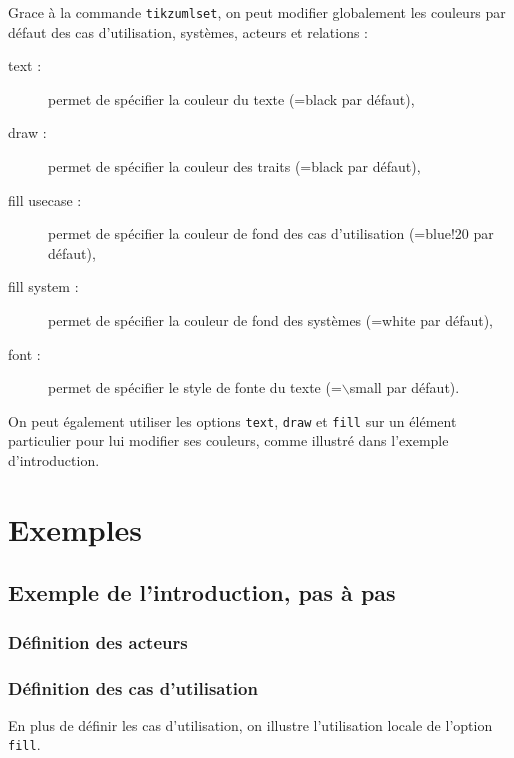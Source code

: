 \documentclass[a4paper,11pt]{report}
\newcommand{\inputTikZ}[1]{%
  }%
\newcommand{\inputTikZ}[1]{%
    \texttt{[image: fig/\#1.pdf]}%
  }%
\begin{document}
Grace à la commande {\tt tikzumlset}, on peut modifier globalement les couleurs par défaut des cas d'utilisation, systèmes, acteurs et relations :

\begin{description}
\item[text :] permet de spécifier la couleur du texte (=black par défaut),
\item[draw :] permet de spécifier la couleur des traits (=black par défaut),
\item[fill usecase :] permet de spécifier la couleur de fond des cas d'utilisation (=blue!20 par défaut),
\item[fill system :] permet de spécifier la couleur de fond des systèmes (=white par défaut),
\item[font :] permet de spécifier le style de fonte du texte (=$\backslash$small par défaut).
\end{description}

On peut également utiliser les options {\tt text}, {\tt draw} et {\tt fill} sur un élément particulier pour lui modifier ses couleurs, comme illustré dans l'exemple d'introduction.

\section{Exemples}

\subsection{Exemple de l'introduction, pas à pas}

\subsubsection{Définition des acteurs}

{\color{red!70!black}

}

\begin{center}
\inputTikZ{usecasediagstep1}
\end{center}

\subsubsection{Définition des cas d'utilisation}

En plus de définir les cas d'utilisation, on illustre l'utilisation locale de l'option {\tt fill}.
\end{document}
